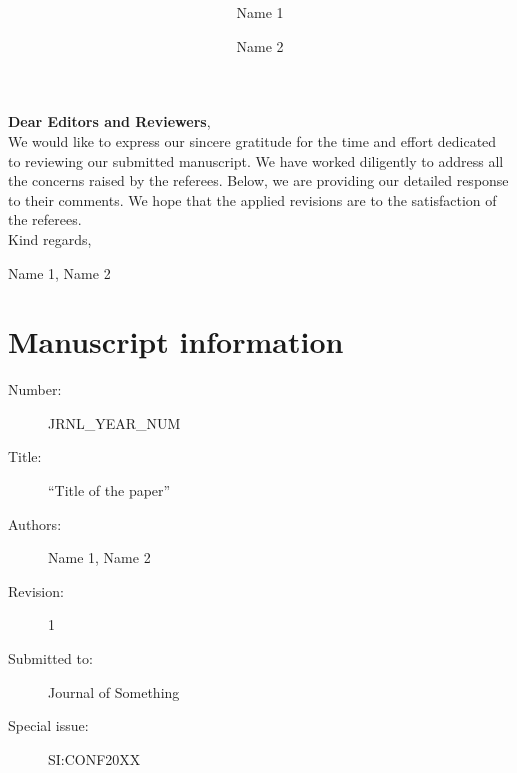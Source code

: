 \documentclass[]{responseletter}
\author[1]{Name 1}
\author[2]{Name 2}
\affil[1]{University 1, City 1, Country 1}
\affil[2]{University 3, City 2, Country 2}
\date{}
\title{\textbf{\PaperTitle}}
\def\PaperTitle{Title of the paper}
\def\PaperId{{JRNL\_YEAR\_NUM}}
\def\PaperRevision{1}
\def\SpecialIssueId{{SI:CONF20XX}}
\def\Journal{{Journal of Something}}
\def\Authors{Name 1, Name 2}
\begin{document}
  \maketitle

  \noindent \textbf{Dear Editors and Reviewers},
  \\[2em]
  \indent We would like to express our sincere gratitude for the time and effort dedicated to reviewing our submitted manuscript. 
  We have worked diligently to address all the concerns raised by the referees.
  Below, we are providing our detailed response to their comments.
  We hope that the applied revisions are to the satisfaction of the referees.
  \\[2em]
  Kind regards,
  \begin{flushright}
    \Authors
  \end{flushright}
  \vfill
  \section*{Manuscript information}
  \begin{description}
    \item[Number:] \PaperId
    \item[Title:] ``\PaperTitle''
    \item[Authors:] \Authors
    \item[Revision:] \PaperRevision
    \item[Submitted to:] \Journal
    \item[Special issue:] \SpecialIssueId
  \end{description}
  \pagebreak

  {
    \hypersetup{linkcolor=black}
    \tableofcontents
    \pagebreak
  }

  
  
  
\end{document}
